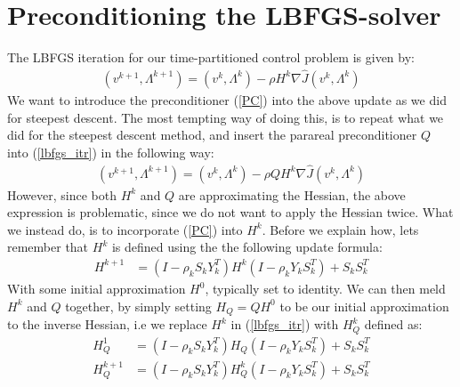 \documentclass[11pt,a4paper]{article}
\begin{document}
\section{Preconditioning the LBFGS-solver}
The LBFGS iteration for our time-partitioned control problem is given by:
\begin{align}
(v^{k+1},\Lambda^{k+1})= (v^{k},\Lambda^{k}) - \rho H^k\nabla\hat{J}(v^{k},\Lambda^{k}) \label{lbfgs_itr}
\end{align}
We want to introduce the preconditioner (\ref{PC}) into the above update as we did for steepest descent. The most tempting way of doing this, is to repeat what we did for the steepest descent method, and insert the parareal preconditioner $Q$ into (\ref{lbfgs_itr}) in the following way:
\begin{align}
(v^{k+1},\Lambda^{k+1})= (v^{k},\Lambda^{k}) - \rho QH^k\nabla\hat{J}(v^{k},\Lambda^{k}) 
\end{align}
However, since both $H^k$ and $Q$ are approximating the Hessian, the above expression is problematic, since we do not want to apply the Hessian twice. What we instead do, is to incorporate (\ref{PC}) into $H^k$. Before we explain how, lets remember that $H^k$ is defined using the the following update formula: 
\begin{align*}
H^{k+1} &= (I-\rho_kS_kY_k^T)H^k(I-\rho_kY_kS_k^T) + S_kS_k^T
\end{align*}
With some initial approximation $H^0$, typically set to identity. We can then meld $H^k$ and $Q$ together, by simply setting $H_Q=QH^0$ to be our initial approximation to the inverse Hessian, i.e we replace $H^k$ in (\ref{lbfgs_itr}) with $H_Q^k$ defined as:
\begin{align*}
H_Q^1 &=(I-\rho_kS_kY_k^T)H_Q(I-\rho_kY_kS_k^T) + S_kS_k^T \\
H_Q^{k+1} &= (I-\rho_kS_kY_k^T)H_Q^k(I-\rho_kY_kS_k^T) + S_kS_k^T
\end{align*}
\end{document}
